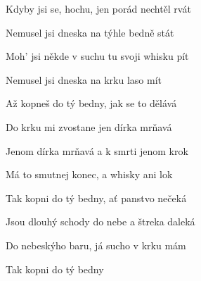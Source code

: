 \begin{song}
\bigskip

\Refren

\bigskip

Kdyby jsi se, hochu, jen porád nechtěl rvát \par
{}Nemusel jsi dneska na týhle bedně stát \par
{}Moh' jsi někde v suchu tu svoji whisku pít \par
{}Nemusel jsi dneska na krku laso mít \par

\bigskip

\Refren

\bigskip

Až kopneš do tý bedny, jak se to dělává \par
{}Do krku mi zvostane jen dírka mrňavá \par
{}Jenom dírka mrňavá a k smrti jenom krok \par
{}Má to smutnej konec, a whisky ani lok \par

\bigskip

Tak kopni do tý bedny, ať panstvo nečeká \par
Jsou dlouhý schody do nebe a štreka daleká \par
Do nebeskýho baru, já sucho v krku mám \par
Tak kopni do tý bedny

\end{song}
